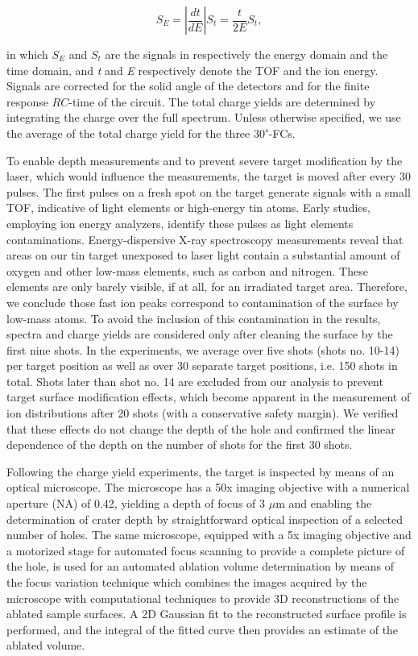 \documentclass[aip, jap, reprint, amsmath, amssymb]{revtex4-1}
\begin{document}
\begin{equation}
S_{E}=|\frac{dt}{dE}|S_{t}=\frac{t}{2E}S_{t},
\end{equation}
 

\noindent in which $S_E$ and $S_t$ are the signals in respectively the energy domain and the time domain, and \textit{t} and \textit{E} respectively denote the TOF and the ion energy. Signals are corrected for the solid angle of the detectors and for the finite response $RC$-time of the circuit. The total charge yields are determined by integrating the charge over the full spectrum. Unless otherwise specified, we use the average of the total charge yield for the three 30\textsuperscript{$\circ$}-FCs. 

To enable depth measurements and to prevent severe target modification by the laser, which would influence the measurements, the target is moved after every 30 pulses. The first pulses on a fresh spot on the target generate signals with a small TOF, indicative of light elements or high-energy tin atoms. Early studies, employing ion energy analyzers, identify these pulses as light elements contaminations\cite{toftmann2013,amoruso2002}. Energy-dispersive X-ray spectroscopy measurements reveal that areas on our tin target unexposed to laser light contain a substantial amount of oxygen and other low-mass elements, such as carbon and nitrogen. These elements are only barely visible, if at all, for an irradiated target area. Therefore, we conclude those fast ion peaks correspond to contamination of the surface by low-mass atoms. To avoid the inclusion of this contamination in the results, spectra and charge yields are considered only after cleaning the surface by the first nine shots. In the experiments, we average over five shots (shots no. 10-14) per target position as well as over 30 separate target positions, i.e. 150 shots in total. Shots later than shot no. 14 are excluded from our analysis to prevent target surface modification effects, which become apparent in the measurement of ion distributions after 20 shots (with a conservative safety margin). We verified that these effects do not change the depth of the hole and confirmed the linear dependence of the depth on the number of shots for the first 30 shots.

Following the charge yield experiments, the target is inspected by means of an optical microscope. The microscope has a 50x imaging objective with a numerical aperture (NA) of 0.42, yielding a depth of focus of 3 $\mu$m and enabling the determination of crater depth by straightforward optical inspection of a selected number of holes. The same microscope, equipped with a 5x imaging objective and a motorized stage for automated focus scanning to provide a complete picture of the hole, is used for an automated ablation volume determination by means of the focus variation technique\cite{danzl2011} which combines the images acquired by the microscope with computational techniques to provide 3D reconstructions of the ablated sample surfaces. A 2D Gaussian fit to the reconstructed surface profile is performed, and the integral of the fitted curve then provides an estimate of the ablated volume.
\end{document}
